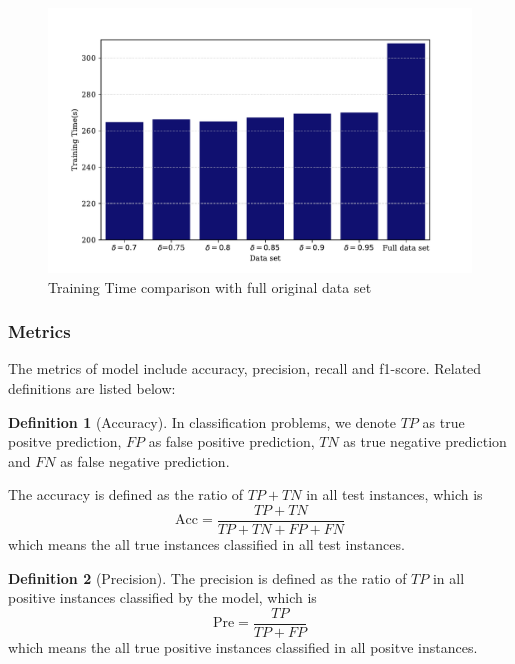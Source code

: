 \documentclass{ieeeaccess}
\theoremstyle{definition}
\newtheorem{defn}{Definition}
\begin{document}
\begin{figure}[!htpb]
    \centering
    \includegraphics[scale=0.45]{fig/training-time-all.pdf}
    \caption{Training Time comparison with full original data set}
    \label{fig:training-time-with-full}
\end{figure}

\subsubsection{Metrics}

The metrics of model include accuracy, precision, recall and f1-score. Related definitions are listed below:

\begin{defn}[Accuracy]
    In classification problems, we denote $TP$ as true positve prediction, $FP$ as false positive prediction, $TN$ as true negative prediction and $FN$ as false negative prediction.

    The accuracy is defined as the ratio of $TP+TN$ in all test instances, which is
    \begin{equation}
        \text{Acc}=\frac{TP+TN}{TP+TN+FP+FN}
    \end{equation}
    which means the all true instances classified in all test instances.
\end{defn}

\begin{defn}[Precision]
    The precision is defined as the ratio of $TP$ in all positive instances classified by the model, which is
    \begin{equation}
        \text{Pre} = \frac{TP}{TP+FP}
    \end{equation}
    which means the all true positive instances classified in all positve instances.
\end{defn}
\end{document}
